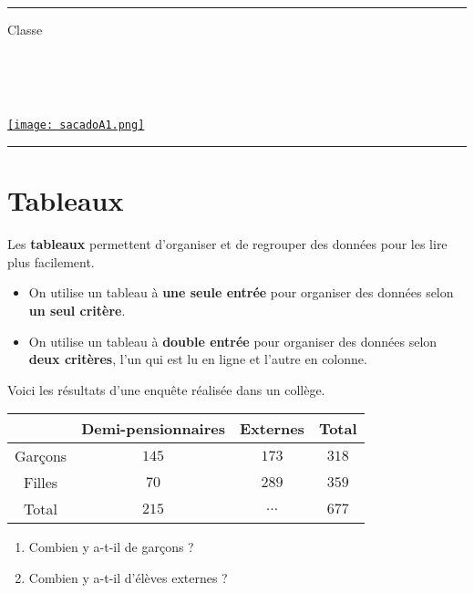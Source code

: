\documentclass[a4paper,dvipsnames]{article}
\begin{document}

\fancyhead[C]{}
\hrule\medskip %
\begin{minipage}{0.295\textwidth} 
\raggedright
Classe \myClasse \hfill\\
\myDiscipline \hfill\\
\myParcours \hfill\\
\end{minipage}
\begin{minipage}{0.4\textwidth} 
\centering 
\scshape\huge
\textcolor{sacado_purple}{\myTitle} \\ 
\normalsize 
\end{minipage}
\begin{minipage}{0.295\textwidth} 
\raggedleft
\href{https://sacado.xyz/}{\texttt{[image: sacadoA1.png]}}
\end{minipage}
\medskip \hrule
\bigskip


\section{Tableaux}

\begin{Def}
Les \textbf{tableaux} permettent d'organiser et de regrouper des données pour les lire plus facilement.
\begin{itemize}
\item On utilise un tableau à \textbf{une seule entrée} pour organiser des données selon \textbf{un seul critère}.
\item On utilise un tableau à \textbf{double entrée} pour organiser des données selon \textbf{deux critères}, l'un qui est lu en ligne et l'autre en colonne.
\end{itemize}
\end{Def}

\begin{ExOApp}[]
Voici les résultats d'une enquête réalisée dans un collège.
\begin{center}
\begin{tabular}{c||c|c|c}
 & Demi-pensionnaires & Externes & Total \\\hline \hline
 Garçons & $145$ & $173$ & $318$ \\\hline
 Filles & $70$ & $289$ & $359$ \\\hline
 Total & $215$ & $...$ & $677$ \\
\end{tabular}
\end{center}
\begin{enumerate}
\item Combien y a-t-il de garçons ?
\item Combien y a-t-il d'élèves externes ?
\end{enumerate}
\end{ExOApp}
\end{document}
